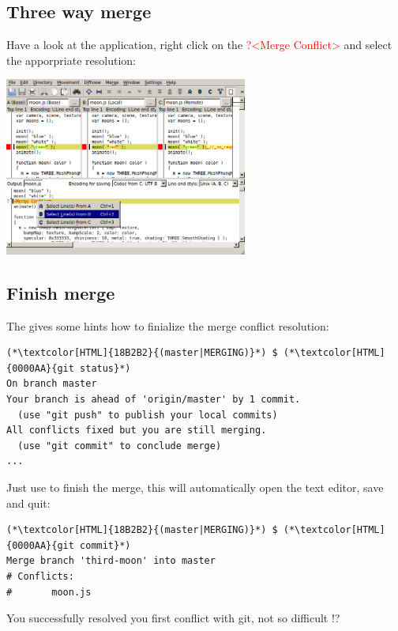 \subsection{Three way merge}
\begin{frame}[fragile]
    \subslidetitle
  Have a look at the  application, right click on the \textcolor{red}{?<Merge Conflict>} and select the apporpriate resolution:
  \newline \vspace{1em}
  \centerline{\includegraphics[width=8cm]{../screen/git-mergetool-kdiff3-resolve.png}}

\end{frame}

\subsection{Finish merge}
\begin{frame}[fragile]
    \subslidetitle
  The  gives some hints how to finialize the merge conflict resolution:
  \begin{lstlisting}
(*\textcolor[HTML]{18B2B2}{(master|MERGING)}*) $ (*\textcolor[HTML]{0000AA}{git status}*)
On branch master
Your branch is ahead of 'origin/master' by 1 commit.
  (use "git push" to publish your local commits)
All conflicts fixed but you are still merging.
  (use "git commit" to conclude merge)
...
\end{lstlisting}

  Just use  to finish the merge, this will automatically open the text editor, save and quit:
  \begin{lstlisting}
(*\textcolor[HTML]{18B2B2}{(master|MERGING)}*) $ (*\textcolor[HTML]{0000AA}{git commit}*)
Merge branch 'third-moon' into master
# Conflicts:
#       moon.js
\end{lstlisting}
  You successfully resolved you first conflict with git, not so difficult !?

\end{frame}


